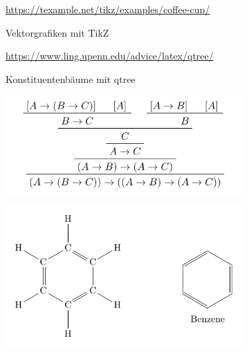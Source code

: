 \begin{figure}[p]
{\begin{subfigure}{\widefigurewidth}
		\end{subfigure}
		\colrules
		\begin{subfigure}[t]{\widefigurewidth}
			\caption{Vektorgrafiken mit TikZ}
			\centering\tiny{\url{https://texample.net/tikz/examples/coffee-cup/}}
			\label{fig:tikz-example}
		\end{subfigure}
		\hspace{\widefiguregap}
		\begin{subfigure}[t]{\widefigurewidth}
			\caption{Konstituentenbäume mit qtree}
			\centering\tiny{\url{https://www.ling.upenn.edu/advice/latex/qtree/}}
			\label{fig:qtree-example}
		\end{subfigure}
		\medskip

		\colrules
		\begin{subfigure}{\widefigurewidth}
			\includegraphics[width=\linewidth]{graphics/prftree.png}
		\end{subfigure}
		\hspace{\widefiguregap}
		\begin{subfigure}{\widefigurewidth}
			\includegraphics[width=\linewidth]{graphics/benzene-ring.pdf}

\end{subfigure}}
\end{figure}
